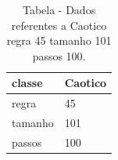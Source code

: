 \begin{table}[H]
\centering
\caption{Tabela - Dados referentes a Caotico regra 45 tamanho 101 passos 100.}
\label{tab:Caotico_regra_45_tamanho_101_passos_100}
\begin{tabular}{ll}
\toprule
classe & Caotico \\
\midrule
regra & 45 \\
tamanho & 101 \\
passos & 100 \\
\bottomrule
\end{tabular}

\end{table}
